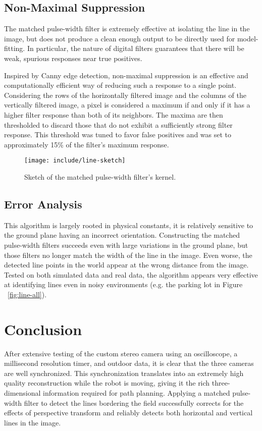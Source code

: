 \documentclass[twocolumn,11pt]{article}
\begin{document}
\subsection{Non-Maximal Suppression}
\label{sec:line-max}
The matched pulse-width filter is extremely effective at isolating the line in
the image, but does not produce a clean enough output to be directly used for
model-fitting. In particular, the nature of digital filters guarantees that
there will be weak, spurious responses near true positives.

Inspired by Canny edge detection, non-maximal suppression is an effective and
computationally efficient way of reducing such a response to a single point.
Considering the rows of the horizontally filtered image and the columns of the
vertically filtered image, a pixel is considered a maximum if and only if it
has a higher filter response than both of its neighbors. The maxima are then
thresholded to discard those that do not exhibit a sufficiently strong filter
response. This threshold was tuned to favor false positives and was set to
approximately 15\% of the filter's maximum response.

\begin{figure}
	\centering
	\texttt{[image: include/line-sketch]}
	\caption{Sketch of the matched pulse-width filter's kernel.}
	\label{fig:line-sketch}
\end{figure}

\subsection{Error Analysis}
\label{sec:line-error}
This algorithm is largely rooted in physical constants, it is relatively
sensitive to the ground plane having an incorrect orientation. Constructing the
matched pulse-width filters succeeds even with large variations in the ground
plane, but those filters no longer match the width of the line in the image.
Even worse, the detected line points in the world appear at the wrong distance
from the image. Tested on both simulated data and real data, the algorithm
appears very effective at identifying lines even in noisy environments (e.g.
the parking lot in Figure ~\ref{fig:line-all}).

\section{Conclusion}
\label{sec:conclusion}
After extensive testing of the custom stereo camera using an oscilloscope, a
millisecond resolution timer, and outdoor data, it is clear that the three
cameras are well synchronized. This synchronization translates into an
extremely high quality reconstruction while the robot is moving, giving it the
rich three-dimensional information required for path planning. Applying a
matched pulse-width filter to detect the lines bordering the field successfully
corrects for the effects of perspective transform and reliably detects both
horizontal and vertical lines in the image. 
\end{document}
